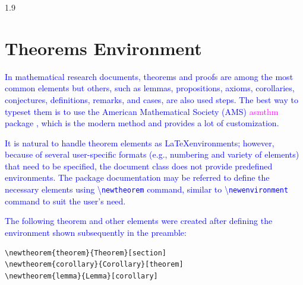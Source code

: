 \documentclass[phd]{ndsu-thesis-2022}
\newcommand\myspacing{1.9} %
\newcommand\italk[1]{\textcolor{blue}{#1}}  %
\newcommand\cmd[1]{\textbackslash\texttt{#1}}  %
\begin{document}
\begin{spacing}{\myspacing}
\section{Theorems Environment}

\italk{In mathematical research documents, theorems and proofs are among the most common elements but others, such as lemmas, propositions, axioms, corollaries, conjectures, definitions, remarks, and cases, are also used steps. The best way to typeset them is to use the American Mathematical Society (AMS) \textcolor{magenta}{asmthm} package \citep{amsthm2017}, which is the modern method and provides a lot of customization.} 

\italk{It is natural to handle theorem elements as \LaTeX environments; however, because of several user-specific formats (e.g., numbering and variety of elements) that need to be specified, the document class does not provide predefined environments. The package documentation may be referred to define the necessary elements using \cmd{newtheorem} command, similar to \cmd{newenvironment} command to suit the user's need.} 

\italk{The following theorem and other elements were created after defining the environment shown subsequently in the preamble:}

\begin{verbatim}
\newtheorem{theorem}{Theorem}[section]
\newtheorem{corollary}{Corollary}[theorem]
\newtheorem{lemma}{Lemma}[corollary]
\end{verbatim}


\end{spacing}
\end{document}

